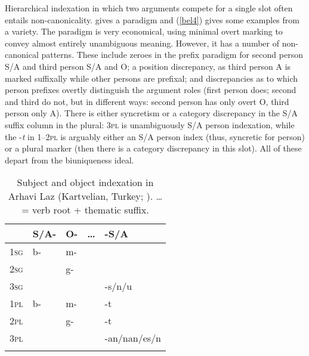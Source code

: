 \documentclass[output=paper,hidelinks]{langscibook}
\begin{document}
Hierarchical indexation in which two arguments compete for a single slot often entails non-canonicality.   gives a paradigm and (\ref{bel4}) gives some examples from a  variety.  The paradigm is very economical, using minimal overt marking to convey almost entirely unambiguous meaning.  However, it has a number of non-canonical patterns.  These include zeroes in the prefix paradigm for second person S/A and third person S/A and O; a position discrepancy, as third person A is marked suffixally while other persons are prefixal; and discrepancies as to which person prefixes overtly distinguish the argument roles (first person does; second and third do not, but in different ways:  second person has only overt O, third person only A).  There is either syncretism or a category discrepancy in the S/A suffix column in the plural:  3\textsc{pl} is unambiguously S/A person indexation, while the -\textit{t} in 1--2\textsc{pl} is arguably either an S/A person index (thus, syncretic for person) or a plural marker (then there is a category discrepancy in this slot).  All of these depart from the biuniqueness ideal.

\begin{table}
\caption{Subject and object indexation in Arhavi Laz (Kartvelian, Turkey; \citealt[283]{Lacroix2009}).  \dots = verb root + thematic suffix.\label{tab4}}
\begin{tabularx}{.6\textwidth}{>{\scshape}Xllll}
\lsptoprule
    & S/A-  & O- & \dots    & -S/A \\
\midrule
1sg & b-    & m- &          &  \\
2sg &       & g- &          &  \\
3sg &       &    &          & -s/n/u \\
\midrule
1pl & b-    & m- &          & -t \\
2pl &       & g- &          & -t \\
3pl &       &    &          & -an/nan/es/n \\
\lspbottomrule
\end{tabularx}
\end{table}
\end{document}
